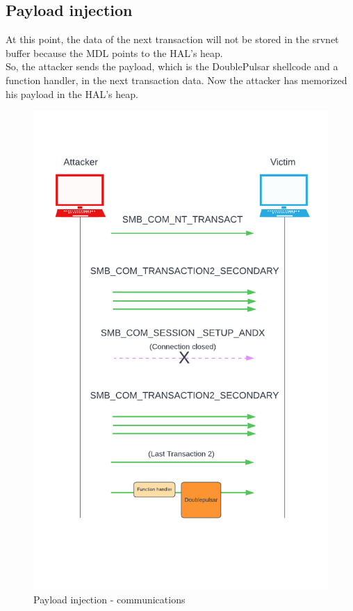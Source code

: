 \clearpage
\subsection{Payload injection}
At this point, the data of the next transaction will not be stored in the srvnet buffer because the MDL points to the HAL's heap.\\
So, the attacker sends the payload, which is the DoublePulsar shellcode and a function handler, in the next transaction data.
Now the attacker has memorized his payload in the HAL's heap.

\begin{figure}[ht!]
    \centering
      \includegraphics[scale=0.5]{images/exploit_6_comm.png}
      \caption{Payload injection - communications}
\end{figure}

